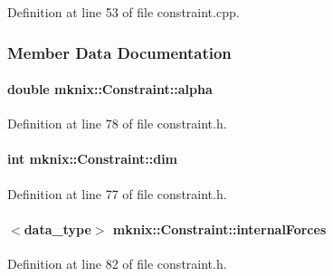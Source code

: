 Definition at line 53 of file constraint.\+cpp.



\subsubsection{Member Data Documentation}
\hypertarget{classmknix_1_1_constraint_ab76845f20e7a29693b9161e09074d55a}{}
\paragraph[{alpha}]{\setlength{\rightskip}{0pt plus 5cm}double mknix\+::\+Constraint\+::alpha\hspace{0.3cm}{\ttfamily [protected]}}\label{classmknix_1_1_constraint_ab76845f20e7a29693b9161e09074d55a}


Definition at line 78 of file constraint.\+h.

\hypertarget{classmknix_1_1_constraint_a5fa3727603b390206e6431141b892517}{}
\paragraph[{dim}]{\setlength{\rightskip}{0pt plus 5cm}int mknix\+::\+Constraint\+::dim\hspace{0.3cm}{\ttfamily [protected]}}\label{classmknix_1_1_constraint_a5fa3727603b390206e6431141b892517}


Definition at line 77 of file constraint.\+h.

\hypertarget{classmknix_1_1_constraint_a0b0fbbf149c32ce0a9dd6e0c4dd5851e}{}
\paragraph[{internal\+Forces}]{$<${\bf data\+\_\+type}$>$ mknix\+::\+Constraint\+::internal\+Forces\hspace{0.3cm}{\ttfamily [protected]}}\label{classmknix_1_1_constraint_a0b0fbbf149c32ce0a9dd6e0c4dd5851e}


Definition at line 82 of file constraint.\+h.

